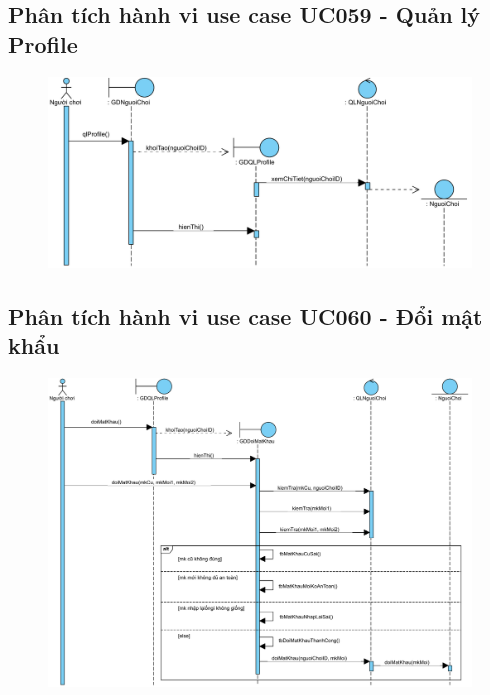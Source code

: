 \documentclass[3p]{elsarticle}
\begin{document}
\subsection{Phân tích hành vi use case UC059 - Quản lý Profile}
\begin{figure}[!htbp]
	\hspace*{-.5in}
	\centering
	\includegraphics[scale=.55]{images/sequence-pdfs/gamer/ProfileManagement.pdf}
\end{figure}
\newpage

\subsection{Phân tích hành vi use case UC060 - Đổi mật khẩu}
\begin{figure}[!htbp]
	\hspace*{-.5in}
	\centering
	\includegraphics[scale=.55]{images/sequence-pdfs/gamer/ProfileManagement_ChangePassword.pdf}
\end{figure}
\newpage
\end{document}

